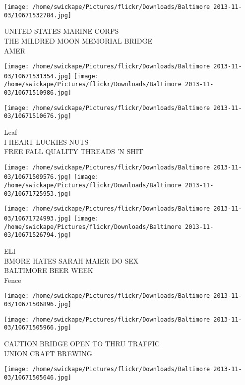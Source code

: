 \documentclass[10pt,letterpaper]{article}
\begin{document}
\vspace{0.25in}
\texttt{[image: /home/swickape/Pictures/flickr/Downloads/Baltimore 2013-11-03/10671532784.jpg]}

UNITED STATES MARINE CORPS\\
THE MILDRED MOON MEMORIAL BRIDGE\\
AMER\\
\pagebreak

\texttt{[image: /home/swickape/Pictures/flickr/Downloads/Baltimore 2013-11-03/10671531354.jpg]}
\texttt{[image: /home/swickape/Pictures/flickr/Downloads/Baltimore 2013-11-03/10671510986.jpg]}

\vspace{0.25in}
\texttt{[image: /home/swickape/Pictures/flickr/Downloads/Baltimore 2013-11-03/10671510676.jpg]}

Leaf\\
I HEART LUCKIES NUTS\\
FREE FALL QUALITY THREADS 'N SHIT\\
\pagebreak

\texttt{[image: /home/swickape/Pictures/flickr/Downloads/Baltimore 2013-11-03/10671509576.jpg]}
\texttt{[image: /home/swickape/Pictures/flickr/Downloads/Baltimore 2013-11-03/10671725953.jpg]}

\texttt{[image: /home/swickape/Pictures/flickr/Downloads/Baltimore 2013-11-03/10671724993.jpg]}
\texttt{[image: /home/swickape/Pictures/flickr/Downloads/Baltimore 2013-11-03/10671526794.jpg]}

ELI\\
BMORE HATES SARAH MAIER DO SEX\\
BALTIMORE BEER WEEK\\
Fence\\
\pagebreak

\texttt{[image: /home/swickape/Pictures/flickr/Downloads/Baltimore 2013-11-03/10671506896.jpg]}

\vspace{0.25in}
\texttt{[image: /home/swickape/Pictures/flickr/Downloads/Baltimore 2013-11-03/10671505966.jpg]}

CAUTION BRIDGE OPEN TO THRU TRAFFIC\\
UNION CRAFT BREWING\\
\pagebreak

\texttt{[image: /home/swickape/Pictures/flickr/Downloads/Baltimore 2013-11-03/10671505646.jpg]}
\end{document}
